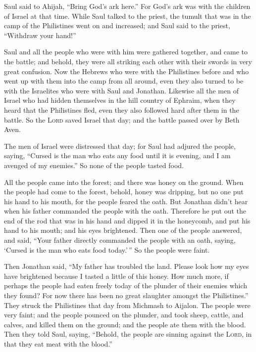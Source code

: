  Saul said to Ahijah, ``Bring God's ark here.'' For God's
ark was with the children of Israel at that time.  While
Saul talked to the priest, the tumult that was in the camp of the
Philistines went on and increased; and Saul said to the priest,
``Withdraw your hand!''

 Saul and all the people who were with him were gathered
together, and came to the battle; and behold, they were all striking
each other with their swords in very great confusion. 
Now the Hebrews who were with the Philistines before and who went up
with them into the camp from all around, even they also turned to be
with the Israelites who were with Saul and Jonathan. 
Likewise all the men of Israel who had hidden themselves in the hill
country of Ephraim, when they heard that the Philistines fled, even they
also followed hard after them in the battle.  So the
\textsc{Lord} saved Israel that day; and the battle passed over by Beth
Aven.

 The men of Israel were distressed that day; for Saul had
adjured the people, saying, ``Cursed is the man who eats any food until
it is evening, and I am avenged of my enemies.'' So none of the people
tasted food.

 All the people came into the forest; and there was honey
on the ground.  When the people had come to the forest,
behold, honey was dripping, but no one put his hand to his mouth, for
the people feared the oath.  But Jonathan didn't hear
when his father commanded the people with the oath. Therefore he put out
the end of the rod that was in his hand and dipped it in the honeycomb,
and put his hand to his mouth; and his eyes brightened. 
Then one of the people answered, and said, ``Your father directly
commanded the people with an oath, saying, `Cursed is the man who eats
food today.'\,'' So the people were faint.

 Then Jonathan said, ``My father has troubled the land.
Please look how my eyes have brightened because I tasted a little of
this honey.  How much more, if perhaps the people had
eaten freely today of the plunder of their enemies which they found? For
now there has been no great slaughter amongst the Philistines.''
 They struck the Philistines that day from Michmash to
Aijalon. The people were very faint;  and the people
pounced on the plunder, and took sheep, cattle, and calves, and killed
them on the ground; and the people ate them with the blood.
 Then they told Saul, saying, ``Behold, the people are
sinning against the \textsc{Lord}, in that they eat meat with the
blood.''

